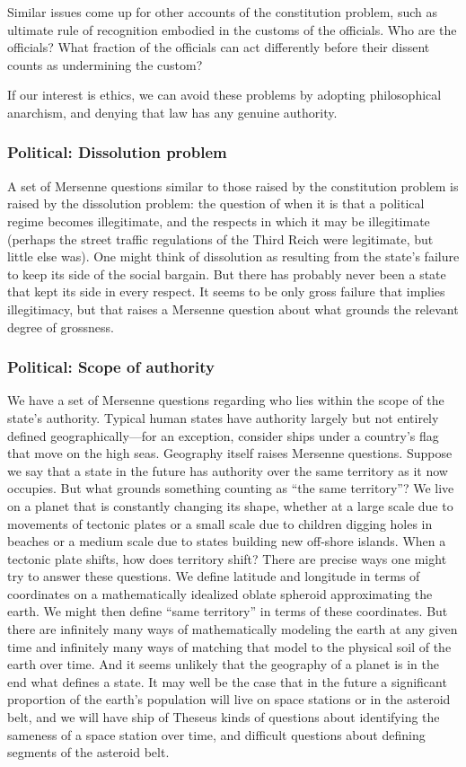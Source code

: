 Similar issues come up for other accounts of the constitution problem, such as  ultimate rule of
recognition embodied in the customs of the officials. Who are the officials? What fraction of the officials 
can act differently before their dissent counts as undermining the custom? 

If our interest is ethics, we can avoid these problems by adopting philosophical anarchism, and denying that 
law has any genuine authority. 

\subsubsection{Political: Dissolution problem}
A set of Mersenne questions similar to those raised by the constitution problem is raised by the dissolution problem: the question
of when it is that a political regime becomes illegitimate, and the respects in which it may be illegitimate (perhaps the
street traffic regulations of the Third Reich were legitimate, but little else was). One might think of dissolution as resulting from the state's failure to
keep its side of the social bargain. But there has probably never been a state that kept its side in every respect. It seems to be only
gross failure that implies illegitimacy, but that raises a Mersenne question about what grounds the relevant degree of grossness.

\subsubsection{Political: Scope of authority}
We have a set of Mersenne questions regarding who lies within the scope of the state's authority. Typical human states
have authority largely but not entirely defined geographically---for an exception, consider ships under a country's flag that
move on the high seas. Geography itself raises Mersenne questions. Suppose we say that a state in the future has authority
over the same territory as it now occupies. But what grounds something counting as ``the same territory''? We live on a planet that is constantly
changing its shape, whether at a large scale due to movements of tectonic plates or a small scale due to children digging holes in beaches or a medium scale due to states building new off-shore islands. When
a tectonic plate shifts, how does territory shift? There are precise ways one might try to answer these questions. We define
latitude and longitude in terms of coordinates on a mathematically idealized oblate spheroid approximating the earth. We might
then define ``same territory'' in terms of these coordinates. But there are infinitely many ways of mathematically modeling the
earth at any given time and infinitely many ways of matching that model to the physical soil of the earth over time.
And it seems unlikely that the geography of a planet is in the end what defines a state. It may well be the case that in the future 
a significant proportion of the earth's population will live on space stations or in the asteroid belt, and we will have ship of Theseus kinds of
questions about identifying the sameness of a space station over time, and difficult questions about defining segments of the asteroid
belt. 

